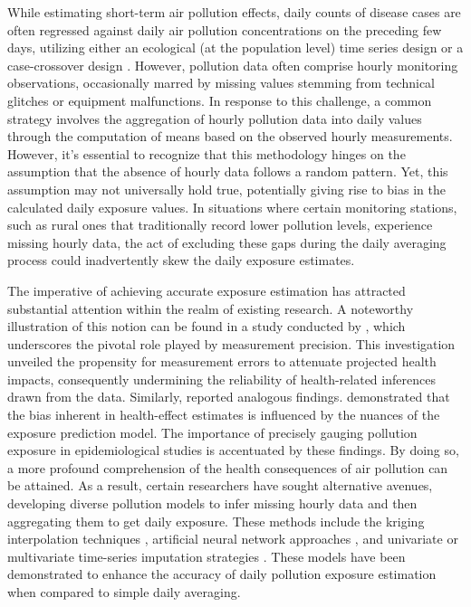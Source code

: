 \documentclass[
  12,
]{article}
\begin{document}
While estimating short-term air pollution effects, daily counts of
disease cases are often regressed against daily air pollution
concentrations on the preceding few days, utilizing either an ecological
(at the population level) time series design \autocites[see
e.g.,][]{Zhou2021,Krall2013,Gouveia2000} or a case-crossover design
\autocites[see
e.g.,][]{Blangiardo2023,Lavigne2022,Liu2019,Di2017,Wing2017}. However,
pollution data often comprise hourly monitoring observations,
occasionally marred by missing values stemming from technical glitches
or equipment malfunctions. In response to this challenge, a common
strategy involves the aggregation of hourly pollution data into daily
values through the computation of means based on the observed hourly
measurements. However, it's essential to recognize that this methodology
hinges on the assumption that the absence of hourly data follows a
random pattern. Yet, this assumption may not universally hold true,
potentially giving rise to bias in the calculated daily exposure values.
In situations where certain monitoring stations, such as rural ones that
traditionally record lower pollution levels, experience missing hourly
data, the act of excluding these gaps during the daily averaging process
could inadvertently skew the daily exposure estimates.

The imperative of achieving accurate exposure estimation has attracted
substantial attention within the realm of existing research. A
noteworthy illustration of this notion can be found in a study conducted
by \textcite{Butland2019}, which underscores the pivotal role played by
measurement precision. This investigation unveiled the propensity for
measurement errors to attenuate projected health impacts, consequently
undermining the reliability of health-related inferences drawn from the
data. Similarly, \textcite{huang2016glaphd} reported analogous findings.
\textcite{Cefalu2014} demonstrated that the bias inherent in
health-effect estimates is influenced by the nuances of the exposure
prediction model. The importance of precisely gauging pollution exposure
in epidemiological studies is accentuated by these findings. By doing
so, a more profound comprehension of the health consequences of air
pollution can be attained. As a result, certain researchers have sought
alternative avenues, developing diverse pollution models to infer
missing hourly data and then aggregating them to get daily exposure.
These methods include the kriging interpolation techniques \autocite[see
e.g.,][]{Cressie1993}, artificial neural network approaches
\autocite[see e.g.,][]{Cordova2021}, and univariate or multivariate
time-series imputation strategies \autocite[see e.g.,][]{Hadeed2020}.
These models have been demonstrated to enhance the accuracy of daily
pollution exposure estimation when compared to simple daily averaging.
\end{document}
